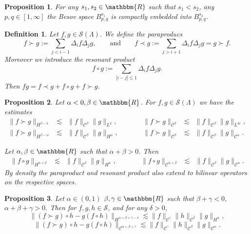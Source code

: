 \documentclass[11pt]{article}
\newcommand{\assign}{:=}
\newtheorem{definition}{Definition}
\newtheorem{proposition}{Proposition}
{\theorembodyfont{\rmfamily}\newtheorem{remark}{Remark}}
\newcommand{\VV}{\mathscr{C}}
\newcommand{\CS}{\mathscr{S}}
\begin{document}
\begin{proposition}
  \label{compactembedding}For any $s_1, s_2 \in \mathbbm{R}$ such that $s_1 <
  s_2$, any $p, q \in [1, \infty]$ the Besov space $B^{s_1}_{p, q_{}}$ is
  compactly embedded into $B^{s_2}_{p, q}$.
\end{proposition}

\begin{definition}
  Let $f, g \in \mathcal{\CS} (\Lambda)$. We define the paraproducs
  \[ f \succ g \assign \sum_{j < i - 1} \Delta_i f \Delta_j g, \qquad
     \text{and} \qquad f \prec g \assign \sum_{j > i + 1} \Delta_i f \Delta_j
     g = g \succ f. \]
  Moreover we introduce the resonant product
  \[ f \circ g \assign \sum_{| i - j | \leqslant 1} \Delta_i f \Delta_j g. \]
  Then $fg = f \prec g + f \circ g + f \succ g$.
\end{definition}

\begin{proposition}
  \label{paraproductestimate}Let $\alpha < 0, \beta \in \mathbbm{R}$. For $f,
  g \in \CS (\Lambda)$ we have the estimates
  \[ \begin{array}{lllllll}
       \| f \succ g \|_{H^{\beta - \delta}} & \lesssim & \| f \|_{\VV^{\beta}}
       \| g \|_{L^2}, &  & \| f \succ g \|_{\VV^{\beta}} & \lesssim & \| f
       \|_{\VV^{\beta}} \| g \|_{L^{\infty}},\\
       \| f \succ g \|_{H^{\beta - \alpha}} & \lesssim & \| f \|_{\VV^{\beta}}
       \| g \|_{H^{\alpha}}, & \qquad & \| f \succ g \|_{\VV^{\beta}} &
       \lesssim & \| f \|_{\VV^{\beta}} \| g \|_{\VV^{\alpha}} .
     \end{array} \]
  
  
  Let $\alpha, \beta \in \mathbbm{R}$ such that $\alpha + \beta > 0$. Then
  \[ \begin{array}{lllllll}
       \| f \circ g \|_{H^{\alpha + \beta}} & \lesssim & \| f \|_{\VV^{\beta}}
       \| g \|_{H^{\alpha}}, & \qquad & \| f \circ g \|_{\VV^{\alpha + \beta}}
       & \lesssim & \| f \|_{\VV^{\beta}} \| g \|_{\VV^{\alpha}} .
     \end{array} \]
  By density the paraproduct and resonant product also extend to bilinear
  operators on the respective spaces. 
\end{proposition}

\begin{proposition}
  \label{commutatorestimate}Let $\alpha \in (0, 1)$ $\beta, \gamma \in
  \mathbbm{R}$ such that $\beta + \gamma < 0$, $\alpha + \beta + \gamma > 0$.
  Then for $f, g, h \in \CS$, and for any $\delta > 0$,
  \[ \| (f \succ g) \circ h - g (f \circ h) \|_{H^{\alpha + \beta + \gamma -
     \delta}} \lesssim \| f \|_{\VV^{\gamma}} \| h \|_{\VV^{\beta}} \| g
     \|_{H^{\alpha}}, \]
  \[ \| (f \succ g) \circ h - g (f \circ h) \|_{\VV^{\alpha + \beta + \gamma}}
     \lesssim \| f \|_{\VV^{\gamma}} \| h \|_{\VV^{\beta}} \| g
     \|_{\VV^{\alpha}} . \]
\end{proposition}
\end{document}
